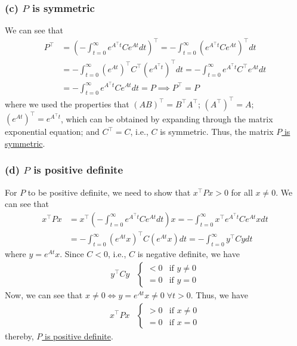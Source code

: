 \subsubsection*{(c) \( P \) is symmetric}

We can see that
\begin{align*}
    P^\top
     & =
    {\left( -\int_{t=0}^{\infty} e^{A^{\top} t} C e^{A t} d t \right)}^\top
    =
    -\int_{t=0}^{\infty} {\left( e^{A^{\top} t} C e^{A t} \right)}^\top d t
    \\ & =
    -\int_{t=0}^{\infty} {\left( e^{A t} \right)}^\top C^\top {\left( e^{A^{\top} t} \right)}^\top d t
    =
    -\int_{t=0}^{\infty} e^{A^\top t} C^\top e^{A t} d t
    \\ & =
    - \int_{t=0}^{\infty} e^{A^\top t} C e^{A t} d t
    =
    P
    \implies
    \boxed{
        P^\top = P
    }
\end{align*}
where we used the properties that \( {(AB)}^\top = B^\top A^\top \); \( {(A^\top)}^\top = A \); \( {(e^{A t})}^\top = e^{A^\top t} \), which can be obtained by expanding through the matrix exponential equation; and \( C^\top = C \), i.e., \( C \) is symmetric.
Thus, the matrix \underline{\( P \) is symmetric}.

\subsubsection*{(d) \( P \) is positive definite}

For \( P \) to be positive definite, we need to show that \( x^\top P x > 0 \) for all \( x \neq 0 \).
We can see that
\begin{align*}
    x^\top P x
     & =
    x^\top \left( -\int_{t=0}^{\infty} e^{A^{\top} t} C e^{A t} d t \right) x
    =
    -\int_{t=0}^{\infty} x^\top e^{A^{\top} t} C e^{A t} x d t
    \\ & =
    -\int_{t=0}^{\infty} {(e^{A t} x)}^\top C {(e^{A t} x)} d t
    =
    -\int_{t=0}^{\infty} y^\top C y d t
\end{align*}
where \( y = e^{A t} x \).
Since \( C < 0 \), i.e., \( C \) is negative definite, we have
\begin{align*}
    y^\top C y
     &
    \begin{cases}
        < 0 & \text{if } y \neq 0
        \\
        = 0 & \text{if } y = 0
    \end{cases}
\end{align*}
Now, we can see that \( x \neq 0 \iff y = e^{A t} x \neq 0 \; \forall t > 0 \).
Thus, we have
\begin{align*}
    x^\top P x
     &
    \begin{cases}
        > 0 & \text{if } x \neq 0
        \\
        = 0 & \text{if } x = 0
    \end{cases}
\end{align*}
thereby, \underline{\( P \) is positive definite}.

